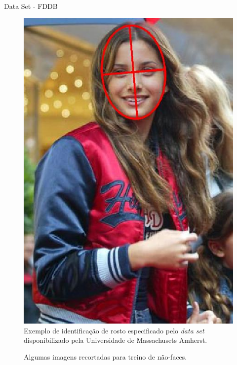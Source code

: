 \documentclass[aspectratio=169, xcolor=dvipsnames]{beamer}
\begin{document}
		\begin{frame}{Data Set - FDDB}
			
			\begin{multicols*}{2}
				
				\begin{figure}[ht]
					\centering
					\includegraphics[width=0.5\linewidth]{img/data_set.jpg}
					\caption{Exemplo de identificação de rosto especificado pelo \textit{data set} disponibilizado pela Universidade de Massachusets Amherst.}
					\label{fig:mulher}
				\end{figure}
				
				\begin{figure}[h]
					\centering
					\qquad
					\qquad
					\caption{Algumas imagens recortadas para treino de não-faces.}%
					\label{fig:fddb_cut}%
				\end{figure}
				
			\end{multicols*}
		\end{frame}
	
\end{document}
